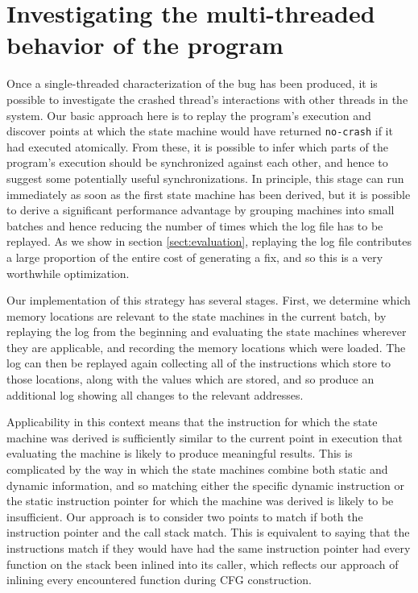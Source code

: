 \documentclass[10pt,twocolumn,preprint,natbib,authoryear]{sigplanconf}
\begin{document}
\section{Investigating the multi-threaded behavior of the program}
\label{sect:multi_threading}

Once a single-threaded characterization of the bug has been produced,
it is possible to investigate the crashed thread's interactions with
other threads in the system.  Our basic approach here is to replay the
program's execution and discover points at which the state machine
would have returned \verb|no-crash| if it had executed atomically.
From these, it is possible to infer which parts of the program's
execution should be synchronized against each other, and hence to
suggest some potentially useful synchronizations.  In principle, this
stage can run immediately as soon as the first state machine has been
derived, but it is possible to derive a significant performance
advantage by grouping machines into small batches and hence reducing
the number of times which the log file has to be replayed.  As we show
in section \ref{sect:evaluation}, replaying the log file contributes a
large proportion of the entire cost of generating a fix, and so this
is a very worthwhile optimization.

Our implementation of this strategy has several stages.  First, we
determine which memory locations are relevant to the state machines in
the current batch, by replaying the log from the beginning and
evaluating the state machines wherever they are applicable, and
recording the memory locations which were loaded.  The log can then be
replayed again collecting all of the instructions which store to those
locations, along with the values which are stored, and so produce an
additional log showing all changes to the relevant addresses.

Applicability in this context means that the instruction for which the
state machine was derived is sufficiently similar to the current point
in execution that evaluating the machine is likely to produce
meaningful results.  This is complicated by the way in which the state
machines combine both static and dynamic information, and so matching
either the specific dynamic instruction or the static instruction
pointer for which the machine was derived is likely to be
insufficient.  Our approach is to consider two points to match if both
the instruction pointer and the call stack match.  This is equivalent
to saying that the instructions match if they would have had the same
instruction pointer had every function on the stack been inlined into
its caller, which reflects our approach of inlining every encountered
function during CFG construction.
\end{document}
